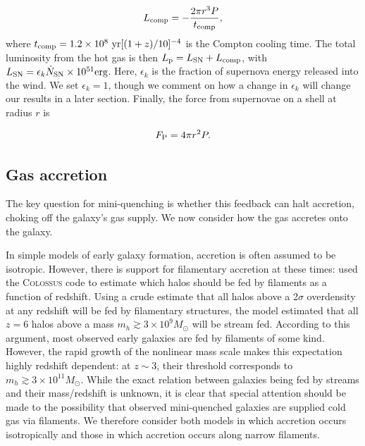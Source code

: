 \documentclass[a4paper,11pt]{article}
\begin{document}
\begin{equation}
    L_{\rm comp} = - \frac{2 \pi r^{3} P }{t_{\rm comp}}, \label{eq:Lcompton}
\end{equation}
%
where $t_{\rm comp} = 1.2 \times 10^{8} \ \mathrm{yr} [(1 + z)/10] ^{-4}$ is the Compton cooling time. The total luminosity from the hot gas is then $L_{\rm p} = L_{\rm SN} + L_{\rm comp}$, with $L_{\rm SN} = \epsilon_{k} \dot{N}_{\rm SN} \times 10^{51} \rm erg$. Here, $\epsilon_{k}$ is the fraction of supernova energy released into the wind. We set $\epsilon_{k} = 1$, though we comment on how a change in $\epsilon_{k}$ will change our results in a later section. Finally, the force from supernovae on a shell at radius $r$ is

\begin{equation}
    F_{\rm P} = 4 \pi r^{2} P.
\end{equation}

\subsection{Gas accretion}

The key question for mini-quenching is whether this feedback can halt accretion, choking off the galaxy's gas supply. We now consider how the gas accretes onto the galaxy.

In simple models of early galaxy formation, accretion is often assumed to be isotropic. However, there is support for filamentary accretion at these times: \cite{Mandelker2018} used the C\textsc{olossus} code \cite{Diemer2015_colossus1, Diemer2018_colossus2} to estimate which halos should be fed by filaments as a function of redshift. Using a crude estimate that all halos above a 2$\sigma$ overdensity at any redshift will be fed by filamentary structures, the model estimated that all $z = 6$ halos above a mass $m_{h} \gtrsim 3 \times 10^{9} M_{\odot}$ will be stream fed. According to this argument, most observed early galaxies are fed by filaments of some kind. However, the rapid growth of the nonlinear mass scale makes this expectation highly redshift dependent: at $z \sim 3$, their threshold corresponds to $m_{h} \gtrsim 3 \times 10^{11} M_{\odot}$. While the exact relation between galaxies being fed by streams and their mass/redshift is unknown, it is clear that special attention should be made to the possibility that observed mini-quenched galaxies are supplied cold gas via filaments. We therefore consider both models in which accretion occurs isotropically and those in which accretion occurs along narrow filaments. 
\end{document}
